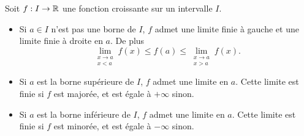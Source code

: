 \documentclass{magnolia}
\begin{document}
\begin{theoreme}[nom={Théorème de la limite monotone}]
Soit $f:I\to\mathbb{R}$ une fonction croissante sur un intervalle $I$.
\begin{itemize}
\item Si $a\in I$ n'est pas une borne de $I$, $f$ admet une limite finie 
  à gauche et une limite finie à droite en $a$. De plus
  \[\lim_{\substack{x\to a\\x<a}} f(x) \leq f(a) \leq
    \lim_{\substack{x\to a\\x>a}} f(x).\]
\item Si $a$ est la borne supérieure de $I$, $f$ admet une limite en $a$.
  Cette limite est finie si $f$ est majorée, et est égale à $+\infty$ sinon.
\item Si $a$ est la borne inférieure de $I$, $f$ admet une limite en $a$.
  Cette limite est finie si $f$ est minorée, et est égale à $-\infty$ sinon.
\end{itemize}
\end{theoreme}
\end{document}
